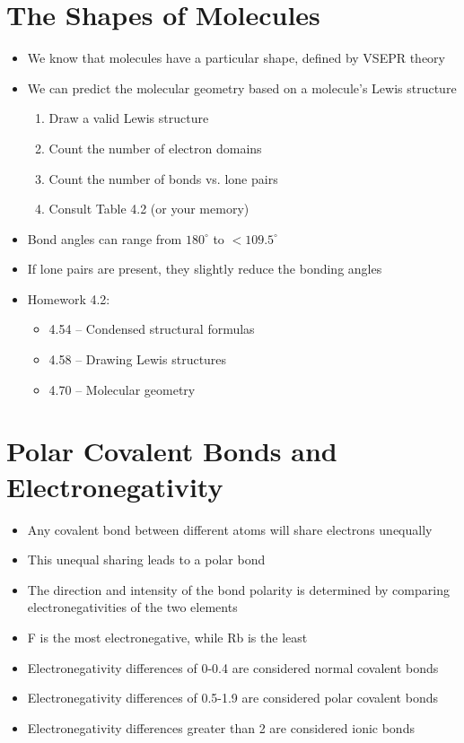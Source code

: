 \documentclass[12pt, openany, letterpaper]{memoir}
\begin{document}
\section{The Shapes of Molecules}
\begin{itemize}
	\item We know that molecules have a particular shape, defined by VSEPR theory
	\item We can predict the molecular geometry based on a molecule's Lewis structure
	\begin{enumerate}
		\item Draw a valid Lewis structure
		\item Count the number of electron domains
		\item Count the number of bonds vs. lone pairs
		\item Consult Table 4.2 (or your memory)
	\end{enumerate}
	\item Bond angles can range from $180^\circ$ to $<109.5^\circ$
	\item If lone pairs are present, they slightly reduce the bonding angles
	\item Homework 4.2:
	\begin{itemize}
		\item 4.54 -- Condensed structural formulas
		\item 4.58 -- Drawing Lewis structures
		\item 4.70 -- Molecular geometry
	\end{itemize}
\end{itemize}
\section{Polar Covalent Bonds and Electronegativity}
\begin{itemize}
	\item Any covalent bond between different atoms will share electrons unequally
	\item This unequal sharing leads to a polar bond
	\item The direction and intensity of the bond polarity is determined by comparing electronegativities of the two elements
	\item F is the most electronegative, while Rb is the least
	\item Electronegativity differences of 0-0.4 are considered normal covalent bonds
	\item Electronegativity differences of 0.5-1.9 are considered polar covalent bonds
	\item Electronegativity differences greater than 2 are considered ionic bonds
\end{itemize}
\end{document}
